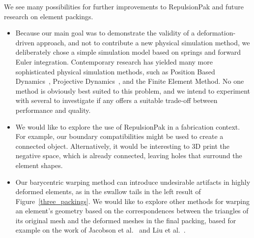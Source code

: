 We see many possibilities for further improvements to RepulsionPak
and future research on element packings.


\begin{itemize}
\item 
	Because our main goal was to demonstrate the validity of a 
	deformation-driven approach, and not to contribute a new
	physical simulation method, we deliberately chose a simple 
	simulation model based on springs and forward Euler integration.
	Contemporary research has yielded many more sophisticated 
	physical simulation methods, such as Position Based Dynamics~\cite{Muller2007}, 
	Projective Dynamics~\cite{Bouaziz2014}, and the Finite Element Method.
	No one method is obviously best suited to this problem, and
	we intend to experiment with several to investigate if any offers
	a suitable trade-off between performance and quality.

\item We would like to explore the use of RepulsionPak in a fabrication context.
      For example, our boundary compatibilities might be used to create a connected object.
      Alternatively, it would be interesting to 3D print the 
      negative space, which is already connected,
	  leaving holes that surround the element shapes.

\item Our barycentric warping method can
	introduce undesirable artifacts in highly deformed elements, as
	in the swallow tails in the left result of Figure~\ref{three_packings}.
	We would like to explore other methods for warping an element's
	geometry based on the correspondences between the triangles of its original
	mesh and the deformed meshes in the final packing, based for example on the
	work of Jacobson et al.~\cite{Jacobson2011} and Liu et al.~\cite{Liu2014}.

\end{itemize}